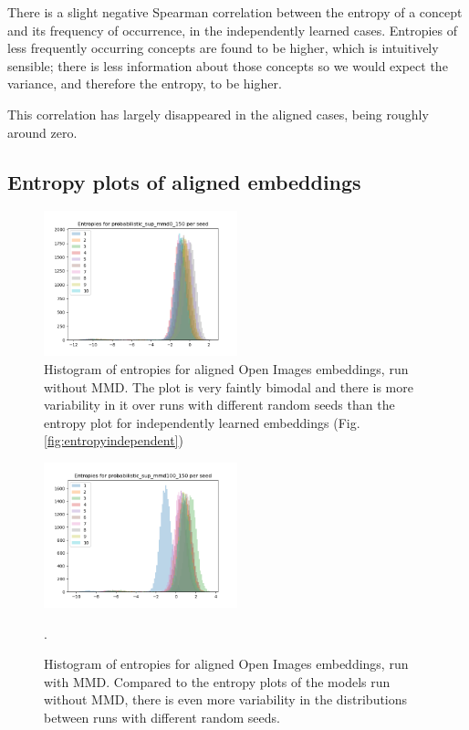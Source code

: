 There is a slight negative Spearman correlation between the entropy of a concept and its frequency of occurrence, in the independently learned cases. Entropies of less frequently occurring concepts are found to be higher, which is intuitively sensible; there is less information about those concepts so we would expect the variance, and therefore the entropy, to be higher. 

This correlation has largely disappeared in the aligned cases, being roughly around zero. 

\subsection{Entropy plots of aligned embeddings}

\begin{figure}[H]
    \centering
    \includegraphics[width=0.5\textwidth]{images/method/probabilistic_aligned/openimages/probabilistic_sup_mmd0_150_entropies.png}
    \caption{
        Histogram of entropies for aligned Open Images embeddings, run without MMD. The plot is very faintly bimodal and there is more variability in it over runs with different random seeds than the entropy plot for independently learned embeddings (Fig. \ref{fig:entropyindependent})
    }
\end{figure}

\begin{figure}[H]

    \centering
    \includegraphics[width=0.5\textwidth]{images/method/probabilistic_aligned/openimages/probabilistic_sup_mmd100_150_entropies.png}
    \caption{
        Histogram of entropies for aligned Open Images embeddings, run with MMD. Compared to the entropy plots of the models run without MMD, there is even more variability in the distributions between runs with different random seeds. 
    }.
\end{figure}

